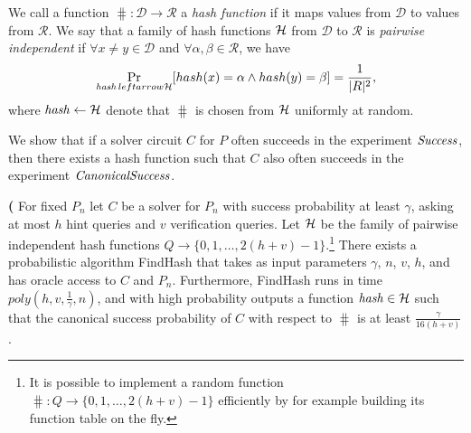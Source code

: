 We call a function $\hash : \mathcal{D} \rightarrow \mathcal{R}$
a \textit{hash function} if it maps values from $\mathcal{D}$ to values from $\mathcal{R}$.
We say that a family of hash functions $\mathcal{H}$ from $\mathcal{D}$ to $\mathcal{R}$ is \textit{pairwise independent}
if $\forall x \neq y \in \mathcal{D}$ and $\forall \alpha, \beta \in \mathcal{R}$, we have
\begin{align}
\underset{\operatorname{\mathit{hash}} leftarrow \mathcal{H}}{\Pr}[hash(x) = \alpha \land hash(y) = \beta] = \frac{1}{|R|^2},
\end{align}
where $\operatorname{\mathit{hash}} \leftarrow \mathcal{H}$ denote that $\hash$ is chosen from $\mathcal{H}$ uniformly at random.

We show that if a solver circuit $C$ for $P$ often succeeds in the experiment $\operatorname{\mathit{Success}}$,
then there exists a hash function such that $C$ also often succeeds in the experiment $\operatorname{\mathit{CanonicalSuccess}}$.
%
%
\begin{lemma}\textbf{(}
\label{lemma:hash_function_probability}
For fixed $P_n$ let $C$ be a solver for $P_n$ with success probability at least $\gamma$,
asking at most $h$ hint queries and $v$ verification queries.
Let $\mathcal{H}$ be the family of pairwise independent hash functions $Q \rightarrow \{0,1, \dots,2(h+v)-1\}$.\footnote{It
is possible to implement a random function $\hash: Q \rightarrow \{0,1,\dotsc, 2(h+v)-1\}$ efficiently by for example building its function table on the fly.}
There exists a probabilistic algorithm FindHash that takes as input
parameters $\gamma$, $n$, $v$, $h$, and has oracle access to $C$ and $P_n$.
Furthermore, FindHash runs in time $\mathit{poly}(h,v,\frac{1}{\gamma},n)$,
and with high probability outputs a function $\operatorname{\mathit{hash}} \in \mathcal{H}$
such that the canonical success probability of $C$ with respect to $\hash$ is at least $\frac{\gamma}{16(h+v)}$.
\end{lemma}
%
